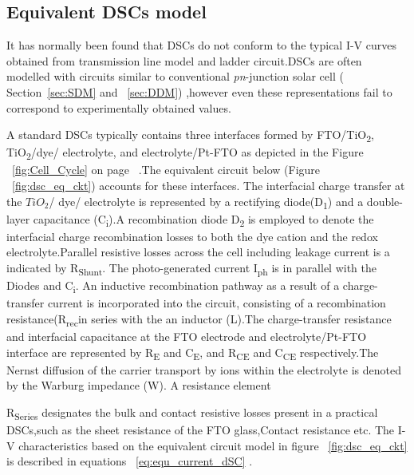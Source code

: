 \subsection{Equivalent DSCs model}

It has normally been found that \ac{DSCs} do not conform to the typical I-V curves obtained from transmission line model and ladder circuit\cite{yong2008modeling}.\ac{DSCs} are often modelled with circuits similar to conventional \textit{pn}-junction solar cell ( Section~\ref{sec:SDM} and ~\ref{sec:DDM}) ,however even these representations fail to correspond to experimentally obtained values.

A standard \ac{DSCs} typically contains three interfaces formed by FTO/TiO\textsubscript{2}, TiO\textsubscript{2}/dye/ electrolyte, and electrolyte/Pt-FTO as depicted in the Figure ~\ref{fig:Cell_Cycle} on page ~\pageref{fig:Cell_Cycle}.The equivalent circuit below (Figure ~\ref{fig:dsc_eq_ckt}) accounts for these interfaces. The interfacial charge transfer at the $TiO_{2}$/ dye/ electrolyte is represented by a rectifying diode(D\textsubscript{1}) and a double-layer capacitance (C\textsubscript{i}).A recombination diode D\textsubscript{2} is employed to denote the interfacial charge recombination losses to both the dye cation and the redox electrolyte.Parallel resistive losses across the cell including leakage current is a indicated by R\textsubscript{Shunt}. The photo-generated current I\textsubscript{ph} is in parallel with the Diodes and C\textsubscript{i}. An inductive recombination pathway as a result of a charge-transfer current is incorporated into the circuit, consisting of a recombination resistance(R\textsubscript{rec}in series with the an inductor (L).The charge-transfer resistance and interfacial capacitance at the FTO electrode and electrolyte/Pt-FTO interface are represented by R\textsubscript{E} and C\textsubscript{E}, and R\textsubscript{CE} and C\textsubscript{CE} respectively.The Nernst diffusion of the carrier transport by ions within the electrolyte is denoted by the Warburg impedance (W). A resistance element {R\textsubscript{Series} designates the bulk and contact resistive losses present in a practical \ac{DSCs},such as the sheet resistance of the FTO glass,Contact resistance etc. The I-V characteristics based on the equivalent circuit model in figure ~\ref{fig:dsc_eq_ckt} is described in equations ~\ref{eq:equ_current_dSC} \cite{yong2008modeling}.
    


}
